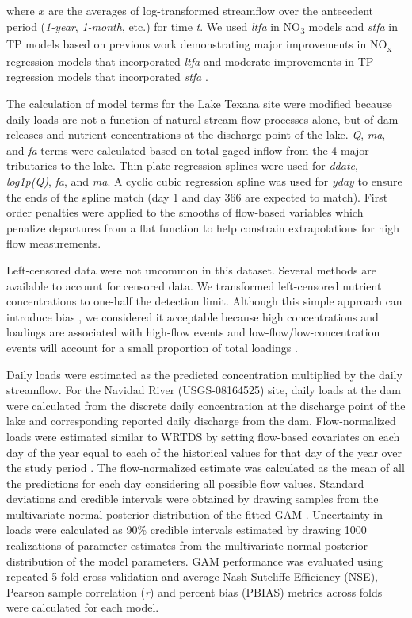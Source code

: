 \documentclass[sn-basic,referee,lineno,pdflatex]{sn-jnl}
\begin{document}
where \(x\) are the averages of log-transformed streamflow over the
antecedent period (\emph{1-year}, \emph{1-month}, etc.) for time
\emph{t}. We used \emph{ltfa} in NO\textsubscript{3} models and
\emph{stfa} in TP models based on previous work demonstrating major
improvements in NO\textsubscript{x} regression models that incorporated
\emph{ltfa} and moderate improvements in TP regression models that
incorporated \emph{stfa} \citep{zhang_improving_2017}.

The calculation of model terms for the Lake Texana site were modified
because daily loads are not a function of natural stream flow processes
alone, but of dam releases and nutrient concentrations at the discharge
point of the lake. \emph{Q}, \emph{ma}, and \emph{fa} terms were
calculated based on total gaged inflow from the 4 major tributaries to
the lake. Thin-plate regression splines were used for \emph{ddate},
\emph{log1p(Q)}, \emph{fa}, and \emph{ma}. A cyclic cubic regression
spline was used for \emph{yday} to ensure the ends of the spline match
(day 1 and day 366 are expected to match). First order penalties were
applied to the smooths of flow-based variables which penalize departures
from a flat function to help constrain extrapolations for high flow
measurements.

Left-censored data were not uncommon in this dataset. Several methods
are available to account for censored data. We transformed left-censored
nutrient concentrations to one-half the detection limit. Although this
simple approach can introduce bias
\citep{hornungEstimationAverageConcentration1990}, we considered it
acceptable because high concentrations and loadings are associated with
high-flow events and low-flow/low-concentration events will account for
a small proportion of total loadings \citep{mcdowell_implications_2021}.

Daily loads were estimated as the predicted concentration multiplied by
the daily streamflow. For the Navidad River (USGS-08164525) site, daily
loads at the dam were calculated from the discrete daily concentration
at the discharge point of the lake and corresponding reported daily
discharge from the dam. Flow-normalized loads were estimated similar to
WRTDS by setting flow-based covariates on each day of the year equal to
each of the historical values for that day of the year over the study
period \citep{hirschWeightedRegressionsTime2010}. The flow-normalized
estimate was calculated as the mean of all the predictions for each day
considering all possible flow values. Standard deviations and credible
intervals were obtained by drawing samples from the multivariate normal
posterior distribution of the fitted GAM
\citep{woodConfidenceIntervalsGeneralized2006, marraCoveragePropertiesConfidence2012, mcdowell_implications_2021}.
Uncertainty in loads were calculated as 90\% credible intervals
estimated by drawing 1000 realizations of parameter estimates from the
multivariate normal posterior distribution of the model parameters. GAM
performance was evaluated using repeated 5-fold cross validation
\citep{burmanComparativeStudyOrdinary1989} and average Nash-Sutcliffe
Efficiency (NSE), Pearson sample correlation (\emph{r}) and percent bias
(PBIAS) metrics across folds were calculated for each model.
\end{document}
